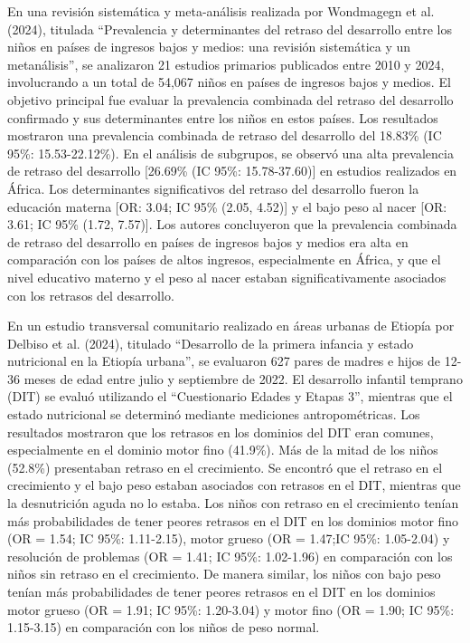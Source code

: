 \documentclass[11pt,letterpaper]{report}
\newcommand{\asq}{“Cuestionario Edades y Etapas 3”}
\begin{document}
En una revisión sistemática y meta-análisis realizada por Wondmagegn et al.
(2024), titulada ``Prevalencia y determinantes del retraso del desarrollo entre
los niños en países de ingresos bajos y medios: una revisión sistemática y un
metanálisis'', se analizaron 21 estudios primarios publicados entre 2010 y
2024, involucrando a un total de 54,067 niños en países de ingresos bajos y
medios. El objetivo principal fue evaluar la prevalencia combinada del retraso
del desarrollo confirmado y sus determinantes entre los niños en estos países.
Los resultados mostraron una prevalencia combinada de retraso del desarrollo
del 18.83\% (IC 95\%: 15.53-22.12\%). En el análisis de subgrupos, se observó
una alta prevalencia de retraso del desarrollo [26.69\% (IC 95\%: 15.78-37.60)]
en estudios realizados en África. Los determinantes significativos del retraso
del desarrollo fueron la educación materna [OR: 3.04; IC 95\% (2.05, 4.52)] y
el bajo peso al nacer [OR: 3.61; IC 95\% (1.72, 7.57)]. Los autores concluyeron
que la prevalencia combinada de retraso del desarrollo en países de ingresos
bajos y medios era alta en comparación con los países de altos ingresos,
especialmente en África, y que el nivel educativo materno y el peso al nacer
estaban significativamente asociados con los retrasos del desarrollo.
\cite{Wondmagegn2024}

En un estudio transversal comunitario realizado en áreas urbanas de Etiopía por
Delbiso et al. (2024), titulado ``Desarrollo de la primera infancia y estado
nutricional en la Etiopía urbana'', se evaluaron 627 pares de madres e hijos de
12-36 meses de edad entre julio y septiembre de 2022. El desarrollo infantil
temprano (DIT) se evaluó utilizando el \asq, mientras que el estado nutricional
se determinó mediante mediciones antropométricas. Los resultados mostraron que
los retrasos en los dominios del DIT eran comunes, especialmente en el dominio
motor fino (41.9\%). Más de la mitad de los niños (52.8\%) presentaban retraso
en el crecimiento. Se encontró que el retraso en el crecimiento y el bajo peso
estaban asociados con retrasos en el DIT, mientras que la desnutrición aguda no
lo estaba. Los niños con retraso en el crecimiento tenían más probabilidades de
tener peores retrasos en el DIT en los dominios motor fino (OR = 1.54; IC 95\%:
1.11-2.15), motor grueso (OR = 1.47;IC 95\%: 1.05-2.04) y resolución de
problemas (OR = 1.41; IC 95\%: 1.02-1.96) en comparación con los niños sin
retraso en el crecimiento. De manera similar, los niños con bajo peso tenían
más probabilidades de tener peores retrasos en el DIT en los dominios motor
grueso (OR = 1.91; IC 95\%: 1.20-3.04) y motor fino (OR = 1.90; IC 95\%:
1.15-3.15) en comparación con los niños de peso normal. \cite{Delbiso2024}
\end{document}
